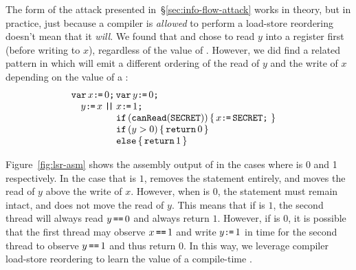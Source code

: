 The form of the attack presented in~\S\ref{sec:info-flow-attack} works in
theory, but in practice, just because a compiler is \emph{allowed} to perform a
load-store reordering doesn't mean that it \emph{will}.
We found that {\GCC} and {\CLANG} chose to read $y$ into a
register first (before writing to $x$), regardless of the value of
{\SEC}.
However, we did find a related pattern in which {\GCC} will emit a
different ordering of the read of $y$ and the write of $x$ depending
on the value of a {\SEC}:
\[\begin{array}[t]{@{}l}
  \VAR x\GETS0\SEMI \VAR y\GETS0\SEMI\\\quad
    y\GETS x
  \PAR\begin{array}[t]{@{}l}
    x\GETS 1\SEMI\\
    \IF(\CANREAD(\SEC))\THEN x\GETS\SEC\SEMI\FI\\
    \IF(y > 0)\THEN \RETURN 0
    \brELSE \RETURN 1\FI
\end{array}\end{array}\]

Figure~\ref{fig:lsr-asm} shows the assembly output of {\GCC} in the cases
where {\SEC} is 0 and 1 respectively.
In the case that {\SEC} is $1$, {\GCC} removes the \IF
statement entirely, and moves the read of $y$ above the write of $x$.
However, when {\SEC} is $0$, the \IF statement must remain
intact, and {\GCC} does not move the read of $y$.
This means that if {\SEC} is $1$, the second thread will always
read $y\,\texttt{==}\,0$ and always return $1$.
However, if {\SEC} is $0$, it is possible that the first thread
may observe $x\,\texttt{==}\,1$ and write $y\texttt{:}\mkern-1mu\texttt{=}\,1$ in time for the second thread
to observe $y\,\texttt{==}\,1$ and thus return $0$.
In this way, we leverage compiler load-store reordering to learn the value of
a compile-time {\SEC}.

